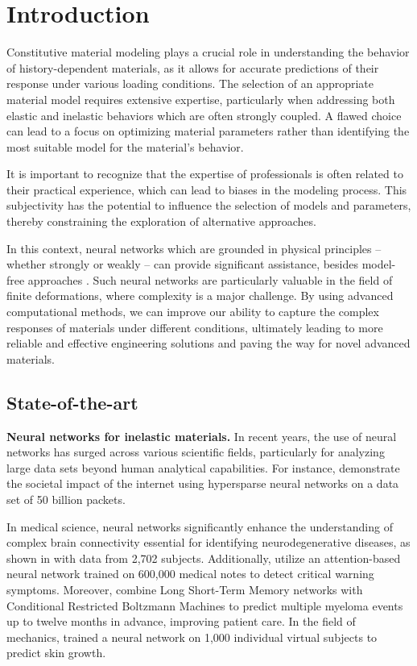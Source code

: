 \section{Introduction}
\label{sec:introduction}
%
Constitutive material modeling plays a crucial role in understanding the behavior of history-dependent materials, as it allows for accurate predictions of their response under various loading conditions. The selection of an appropriate material model requires extensive expertise, particularly when addressing both elastic and inelastic behaviors which are often strongly coupled. A flawed choice can lead to a focus on optimizing material parameters rather than identifying the most suitable model for the material's behavior.

It is important to recognize that the expertise of professionals is often related to their practical experience, which can lead to biases in the modeling process. This subjectivity has the potential to influence the selection of models and parameters, thereby constraining the exploration of alternative approaches.

In this context, neural networks which are grounded in physical principles -- whether strongly or weakly -- can provide significant assistance, besides model-free approaches \cite{EggersmannKirchdoerferEtAl2019,PRUME2023115704}. Such neural networks are particularly valuable in the field of finite deformations, where complexity is a major challenge. By using advanced computational methods, we can improve our ability to capture the complex responses of materials under different conditions, ultimately leading to more reliable and effective engineering solutions and paving the way for novel advanced materials.
%
\subsection{State-of-the-art}
\label{sec:state_art}
%
\textbf{Neural networks for inelastic materials.} In recent years, the use of neural networks has surged across various scientific fields, particularly for analyzing large data sets beyond human analytical capabilities. For instance, \citet{kepner2019} demonstrate the societal impact of the internet using hypersparse neural networks on a data set of 50 billion packets.

In medical science, neural networks significantly enhance the understanding of complex brain connectivity essential for identifying neurodegenerative diseases, as shown in \cite{xu2023datadrivennetworkneurosciencedata} with data from 2,702 subjects. Additionally, \citet{girardi2018patientriskassessmentwarning} utilize an attention-based neural network trained on 600,000 medical notes to detect critical warning symptoms.
Moreover, \citet{ferle2024predictingprogressioneventsmultiple} combine Long Short-Term Memory networks with Conditional Restricted Boltzmann Machines to predict multiple myeloma events up to twelve months in advance, improving patient care.
In the field of mechanics, \citet{Nagle2024} trained a neural network on 1,000 individual virtual subjects to predict skin growth.

